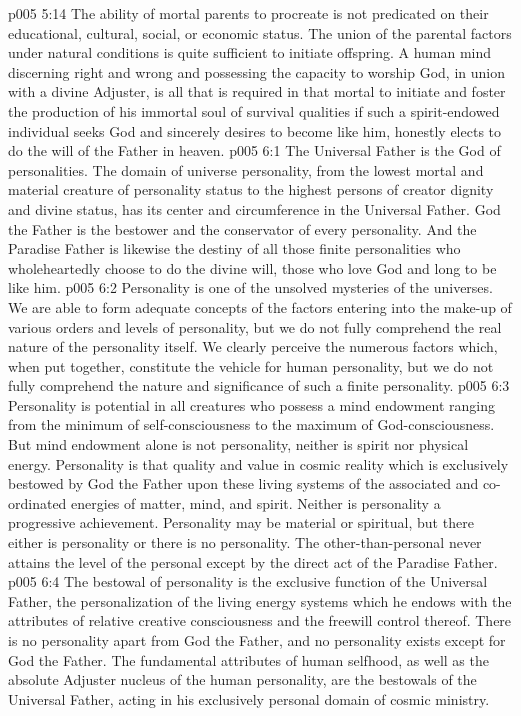 \vs p005 5:14 The ability of mortal parents to procreate is not predicated on their educational, cultural, social, or economic status. The union of the parental factors under natural conditions is quite sufficient to initiate offspring. A human mind discerning right and wrong and possessing the capacity to worship God, in union with a divine Adjuster, is all that is required in that mortal to initiate and foster the production of his immortal soul of survival qualities if such a spirit\hyp{}endowed individual seeks God and sincerely desires to become like him, honestly elects to do the will of the Father in heaven.\plusone
{}
\vs p005 6:1 The Universal Father is the God of personalities. The domain of universe personality, from the lowest mortal and material creature of personality status to the highest persons of creator dignity and divine status, has its center and circumference in the Universal Father. God the Father is the bestower and the conservator of every personality. And the Paradise Father is likewise the destiny of all those finite personalities who wholeheartedly choose to do the divine will, those who love God and long to be like him.
\pc \vs p005 6:2 Personality is one of the unsolved mysteries of the universes. We are able to form adequate concepts of the factors entering into the make\hyp{}up of various orders and levels of personality, but we do not fully comprehend the real nature of the personality itself. We clearly perceive the numerous factors which, when put together, constitute the vehicle for human personality, but we do not fully comprehend the nature and significance of such a finite personality.
\vs p005 6:3 Personality is potential in all creatures who possess a mind endowment ranging from the minimum of self\hyp{}consciousness to the maximum of God\hyp{}consciousness. But mind endowment alone is not personality, neither is spirit nor physical energy. Personality is that quality and value in cosmic reality which is exclusively bestowed by God the Father upon these living systems of the associated and co\hyp{}ordinated energies of matter, mind, and spirit. Neither is personality a progressive achievement. Personality may be material or spiritual, but there either is personality or there is no personality. The other\hyp{}than\hyp{}personal never attains the level of the personal except by the direct act of the Paradise Father.
\vs p005 6:4 The bestowal of personality is the exclusive function of the Universal Father, the personalization of the living energy systems which he endows with the attributes of relative creative consciousness and the freewill control thereof. There is no personality apart from God the Father, and no personality exists except for God the Father. The fundamental attributes of human selfhood, as well as the absolute Adjuster nucleus of the human personality, are the bestowals of the Universal Father, acting in his exclusively personal domain of cosmic ministry.
